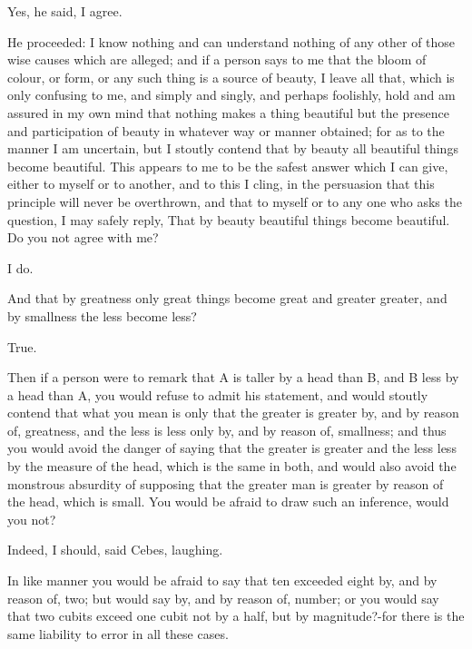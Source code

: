 \documentclass[11pt,letter]{article}
\begin{document}
\par  Yes, he said, I agree.

\par  He proceeded: I know nothing and can understand nothing of any other of those wise causes which are alleged; and if a person says to me that the bloom of colour, or form, or any such thing is a source of beauty, I leave all that, which is only confusing to me, and simply and singly, and perhaps foolishly, hold and am assured in my own mind that nothing makes a thing beautiful but the presence and participation of beauty in whatever way or manner obtained; for as to the manner I am uncertain, but I stoutly contend that by beauty all beautiful things become beautiful. This appears to me to be the safest answer which I can give, either to myself or to another, and to this I cling, in the persuasion that this principle will never be overthrown, and that to myself or to any one who asks the question, I may safely reply, That by beauty beautiful things become beautiful. Do you not agree with me?

\par  I do.

\par  And that by greatness only great things become great and greater greater, and by smallness the less become less?

\par  True.

\par  Then if a person were to remark that A is taller by a head than B, and B less by a head than A, you would refuse to admit his statement, and would stoutly contend that what you mean is only that the greater is greater by, and by reason of, greatness, and the less is less only by, and by reason of, smallness; and thus you would avoid the danger of saying that the greater is greater and the less less by the measure of the head, which is the same in both, and would also avoid the monstrous absurdity of supposing that the greater man is greater by reason of the head, which is small. You would be afraid to draw such an inference, would you not?

\par  Indeed, I should, said Cebes, laughing.

\par  In like manner you would be afraid to say that ten exceeded eight by, and by reason of, two; but would say by, and by reason of, number; or you would say that two cubits exceed one cubit not by a half, but by magnitude?-for there is the same liability to error in all these cases.
\end{document}
